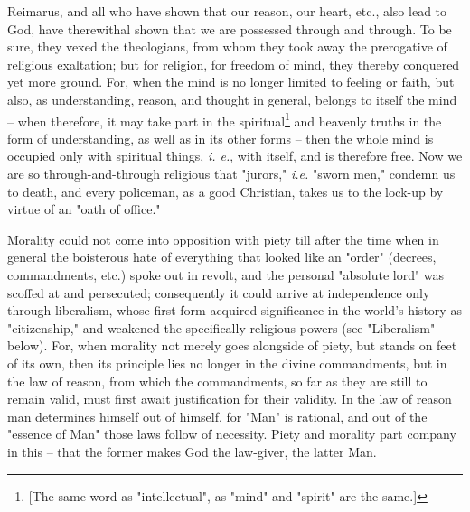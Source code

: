 Reimarus, and all who have shown that our reason, our heart, etc., also lead 
to God, have therewithal shown that we are possessed through and through. To 
be sure, they vexed the theologians, from whom they took away the prerogative 
of religious exaltation; but for religion, for freedom of mind, they thereby 
conquered yet more ground. For, when the mind is no longer limited to feeling 
or faith, but also, as understanding, reason, and thought in general, belongs 
to itself the mind -- when therefore, it may take part in the 
spiritual\footnote{[The same word as "{}intellectual"{}, as "{}mind"{} and 
"{}spirit"{} are the same.]} and heavenly truths in the form of understanding, 
as well as in its other forms -- then the whole mind is occupied only with 
spiritual things, \textit{i. e.}, with itself, and is therefore free. Now we 
are so through-and-through religious that "{}jurors,"{} \textit{i.e.} "{}sworn 
men,"{} condemn us to death, and every policeman, as a good Christian, takes 
us to the lock-up by virtue of an "{}oath of office."{}

Morality could not come into opposition with piety till after the time when in 
general the boisterous hate of everything that looked like an "{}order"{} 
(decrees, commandments, etc.) spoke out in revolt, and the personal 
"{}absolute lord"{} was scoffed at and persecuted; consequently it could 
arrive at independence only through liberalism, whose first form acquired 
significance in the world's history as "{}citizenship,"{} and weakened the 
specifically religious powers (see "{}Liberalism"{} below). For, when morality 
not merely goes alongside of piety, but stands on feet of its own, then its 
principle lies no longer in the divine commandments, but in the law of reason, 
from which the commandments, so far as they are still to remain valid, must 
first await justification for their validity. In the law of reason man 
determines himself out of himself, for "{}Man"{} is rational, and out of the 
"{}essence of Man"{} those laws follow of necessity. Piety and morality part 
company in this -- that the former makes God the law-giver, the latter Man.

